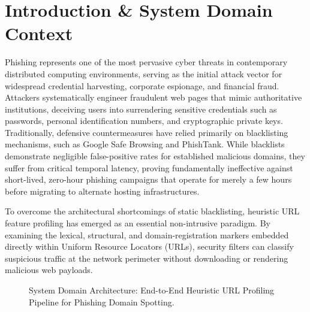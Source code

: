 \section{Introduction \& System Domain Context}
\label{sec:intro}

Phishing represents one of the most pervasive cyber threats in contemporary distributed computing environments, serving as the initial attack vector for widespread credential harvesting, corporate espionage, and financial fraud. Attackers systematically engineer fraudulent web pages that mimic authoritative institutions, deceiving users into surrendering sensitive credentials such as passwords, personal identification numbers, and cryptographic private keys. Traditionally, defensive countermeasures have relied primarily on blacklisting mechanisms, such as Google Safe Browsing and PhishTank. While blacklists demonstrate negligible false-positive rates for established malicious domains, they suffer from critical temporal latency, proving fundamentally ineffective against short-lived, zero-hour phishing campaigns that operate for merely a few hours before migrating to alternate hosting infrastructures.

To overcome the architectural shortcomings of static blacklisting, heuristic URL feature profiling has emerged as an essential non-intrusive paradigm. By examining the lexical, structural, and domain-registration markers embedded directly within Uniform Resource Locators (URLs), security filters can classify suspicious traffic at the network perimeter without downloading or rendering malicious web payloads.

\begin{figure}[htbp]
\centering
{}
\caption{System Domain Architecture: End-to-End Heuristic URL Profiling Pipeline for Phishing Domain Spotting.}
\label{fig:domain_context}
\end{figure}

